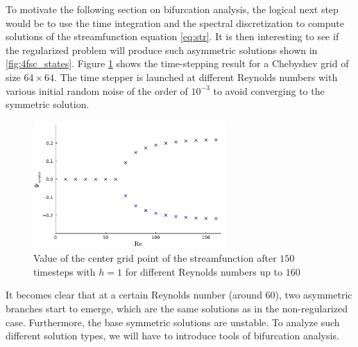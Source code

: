 To motivate the following section on bifurcation analysis, the logical next
step would be to use the time integration and the spectral discretization to
compute solutions of the streamfunction equation \eqref{eq:str}. It is then
interesting to see if the regularized problem will produce such asymmetric
solutions shown in \ref{fig:4fsc_states}. Figure \ref{fig:timestepping} shows
the time-stepping result for a Chebyshev grid of size $64 \times 64$. The time
stepper is launched at different Reynolds numbers with various initial random
noise of the order of $10^{-3}$ to avoid converging to the symmetric solution.

\begin{figure}[ht!]
\begin{center}
  \includegraphics[width=0.65\textwidth]{figs/timestepping64x64.pdf}
\end{center}
\caption{Value of the center grid point of the streamfunction after $150$
  timesteps with $h=1$ for different Reynolds numbers up to $160$}
\label{fig:timestepping}
\end{figure}

It becomes clear that at a certain Reynolds number (around $60$), two
asymmetric branches start to emerge, which are the same solutions as in the
non-regularized case. Furthermore, the base symmetric solutions are unstable.
To analyze such different solution types, we will have to introduce tools of
bifurcation analysis.
